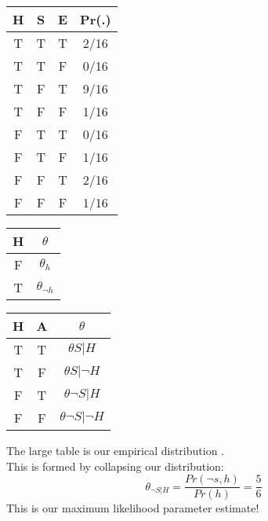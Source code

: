 \documentclass[../../lecture_notes.tex]{subfiles}
\begin{document}
\begin{center}\begin{minipage}{0.3\linewidth}\end{minipage}%
\begin{minipage}{0.7\linewidth}
\begin{center} \begin{minipage} {0.35\linewidth}
\begin{tabular}{ | c c c | c | }\hline 
	H & S & E & Pr(.)\\\hline 
	T & T & T & 2/16\\
	T & T & F & 0/16\\
	T & F & T & 9/16\\
	T & F & F & 1/16\\
	F & T & T & 0/16\\
	F & T & F & 1/16\\
	F & F & T & 2/16\\
	F & F & F & 1/16\\\hline
\end{tabular}\end{minipage}%
\begin{minipage}{0.35\linewidth}
\begin{tabular}{ | c | c | }\hline H & $\theta$\\\hline F & $\theta_h$\\T & $\theta_{\neg h}$\\\hline\end{tabular}\newline
\begin{tabular}{ | c | c | c | }\hline H & A & $\theta$\\\hline 
	T & T & $\theta{S|H}$\\
	T & F & $\theta{S|\neg H}$\\
	F & T & $\theta{\neg S|H}$\\ 
	F& F & $\theta{\neg S|\neg H}$\\\hline
\end{tabular}\end{minipage}\end{center}\end{minipage}\end{center}
\noindent The large table is our empirical distribution .\\
This is formed by collapsing our distribution:\begin{equation*}
	\theta_{\neg S|H} = \frac{Pr(\neg s,h)}{Pr(h)} = \frac{5}{6}\end{equation*}
This is our maximum likelihood parameter estimate!
\end{document}
